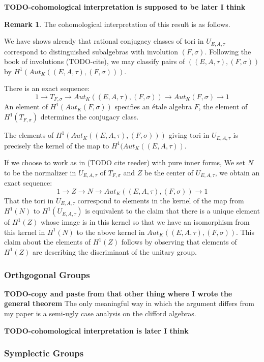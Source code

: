 \documentclass{article}
\theoremstyle{plain}
\theoremstyle{definition}
\newtheorem{remark}[theorem]{Remark}
\numberwithin{equation}{section}
\newcommand{\TODO}[1]{\textbf{TODO-#1}}
\begin{document}
\TODO{cohomological interpretation is supposed to be later I think}
\begin{remark}
The cohomological interpretation of this result is as follows.

We have shows already that rational conjugacy classes of tori in $U_{E,A,\tau}$ correspond to distinguished subalgebras with involution $(F,\sigma)$.
Following the book of involutions (TODO-cite), we may classify pairs of $((E,A,\tau),(F,\sigma))$ by $H^1(Aut_K((E,A,\tau),(F,\sigma)))$.

There is an exact sequence:
\[ 1 \rightarrow T_{F,\sigma} \rightarrow Aut_K((E,A,\tau),(F,\sigma)) \rightarrow Aut_K(F,\sigma) \rightarrow 1 \]
An element of $H^1(Aut_K(F,\sigma))$ specifies an \'etale algebra $F$, the element of $H^1(T_{F,\sigma})$ determines the conjugacy class.

The elements of $H^1( Aut_K((E,A,\tau),(F,\sigma)))$ giving tori in $U_{E,A,\tau}$ is precisely the kernel of the map to $H^1(Aut_K((E,A,\tau))$.

If we choose to work as in  (TODO cite reeder) with pure inner forms,
We set $N$ to be the normalizer in $U_{E,A,\tau}$ of $T_{F,\sigma}$ and $Z$ be the center of $U_{E,A,\tau}$, we obtain an exact sequence:
\[ 1 \rightarrow Z \rightarrow N \rightarrow Aut_K((E,A,\tau),(F,\sigma)) \rightarrow 1 \]
That the tori in $U_{E,A,\tau}$ correspond to elements in the kernel of the map from $H^1(N)$ to $H^1(U_{E,A,\tau})$ is equivalent to the claim that there is a unique element of $H^1(Z)$ whose image is in this kernel so that we have an isomorphism from this kernel in $H^1(N)$ to the above kernel in $Aut_K((E,A,\tau),(F,\sigma))$. This claim about the elements of $H^1(Z)$ follows by observing that elements of $H^1(Z)$ are describing the discriminant of the unitary group.
\end{remark}

\subsubsection{Orthgogonal Groups}

\TODO{copy and paste from that other thing where I wrote the general theorem}
The only meaningful way in which the argument differs from my paper is a semi-ugly case analysis on the clifford algebras.

\TODO{cohomological interpretation is later I think}

\subsubsection{Symplectic Groups}
\end{document}
